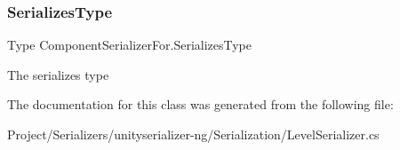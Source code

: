 \subsubsection{\texorpdfstring{Serializes\+Type}{SerializesType}}
{\footnotesize\ttfamily Type Component\+Serializer\+For.\+Serializes\+Type}



The serializes type 



The documentation for this class was generated from the following file\+:\begin{DoxyCompactItemize}
\item 
Project/\+Serializers/unityserializer-\/ng/\+Serialization/Level\+Serializer.\+cs\end{DoxyCompactItemize}
